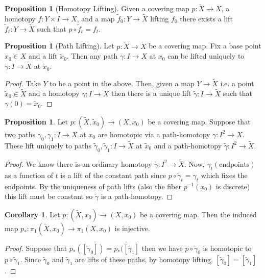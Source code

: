 \documentclass[12pt]{extarticle}
\theoremstyle{definition}
\newtheorem{proposition}[theorem]{Proposition}
\newtheorem{corollary}[theorem]{Corollary}
\begin{document}
\begin{proposition}[Homotopy Lifting]
Given a covering map $p : \tilde{X} \to X$, a homotopy $f : Y \times I \to X$, and a map $\tilde{f}_0 : Y \to \tilde{X}$ lifting $f_0$ there exists a lift $\tilde{f}_t : Y \to \tilde{X}$ such that $p \circ \tilde{f}_t = f_t$.  
\end{proposition}

\begin{proposition}[Path Lifting]
Let $p : \tilde{X} \to X$ be a covering map. Fix a base point $x_0 \in X$ and a lift $\tilde{x}_0$. Then any path $\gamma : I \to X$ at $x_0$ can be lifted uniquely to $\tilde{\gamma} : I \to \tilde{X}$ at $\tilde{x}_0$. 
\end{proposition}

\begin{proof}
Take $Y$ to be a point in the above. Then, given a map $Y \to \tilde{X}$ i.e. a point $\tilde{x}_0 \in \tilde{X}$ and a homotopy $\gamma : I \to X$ then there is a unique lift $\tilde{\gamma} : I \to \tilde{X}$ such that $\gamma(0) = \tilde{x}_0$. 
\end{proof}

\begin{proposition}
Let $p : (\tilde{X}, \tilde{x}_0) \to (X, x_0)$ be a covering map. Suppose that two paths $\gamma_0, \gamma_1 : I \to X$ at $x_0$ are homotopic via a path-homotopy $\gamma : I^2 \to X$. These lift uniquely to paths $\tilde{\gamma}_0, \tilde{\gamma}_1 : I \to \tilde{X}$ at $\tilde{x}_0$ and a path-homotopy $\tilde{\gamma} : I^2 \to \tilde{X}$.
\end{proposition}

\begin{proof}
We know there is an ordinary homotopy $\tilde{\gamma} : I^2 \to \tilde{X}$. Now, $\tilde{\gamma}_t(\text{endpoints})$ as a function of $t$ is a lift of the constant path since $p \circ \tilde{\gamma}_t = \gamma_t$ which fixes the endpoints. By the uniqueness of path lifts (also the fiber $p^{-1}(x_0)$ is discrete) this lift must be constant so $\tilde{\gamma}$ is a path-homotopy. 
\end{proof}

\begin{corollary}
Let $p : (\tilde{X}, x_0) \to (X, x_0)$ be a covering map. Then the induced map $p_* : \pi_1(\tilde{X}, x_0) \to \pi_1(X, x_0)$ is injective.
\end{corollary}

\begin{proof}
Suppose that $p_*([\tilde{\gamma}_0]) = p_*([\tilde{\gamma}_1]$ then we have $p \circ \tilde{\gamma}_0$ is homotopic to $p \circ \tilde{\gamma}_1$. Since $\tilde{\gamma}_0$ and $\tilde{\gamma}_1$ are lifts of these paths, by homotopy lifting, $[\tilde{\gamma}_0] = [\tilde{\gamma}_1]$. 
\end{proof}
\end{document}
